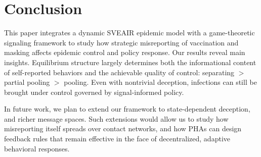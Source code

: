 \documentclass[sigconf,review]{acmart}
\begin{document}


\section{Conclusion}
This paper integrates a dynamic SVEAIR epidemic model with a game-theoretic signaling framework to study how strategic misreporting of vaccination and masking affects epidemic control and policy response. %
Our results reveal main insights. Equilibrium structure largely determines both the informational content of self-reported behaviors and the achievable quality of control: separating $>$ partial pooling $>$ pooling. %
Even with nontrivial deception, infections can still be brought under control governed by signal-informed policy. %


In future work, we plan to extend our framework to state-dependent deception, and richer message spaces. %
Such extensions would allow us to study how misreporting itself spreads over contact networks, and how PHAs can design feedback rules that remain effective in the face of decentralized, adaptive behavioral responses.
\end{document}
